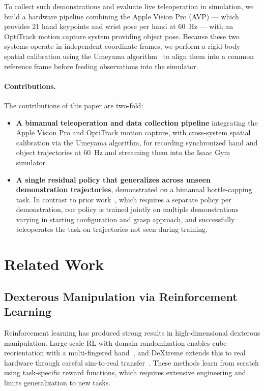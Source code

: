 To collect such demonstrations and evaluate live teleoperation in simulation, we build
a hardware pipeline combining the Apple Vision Pro (AVP) --- which provides 21 hand
keypoints and wrist pose per hand at \SI{60}{\hertz} --- with an OptiTrack motion
capture system providing object pose.
Because these two systems operate in independent coordinate frames, we perform a
rigid-body spatial calibration using the Umeyama algorithm~\cite{umeyama} to align
them into a common reference frame before feeding observations into the simulator.
 
\paragraph{Contributions.}
The contributions of this paper are two-fold:
\begin{itemize}
    \item \textbf{A bimanual teleoperation and data collection pipeline} integrating the
    Apple Vision Pro and OptiTrack motion capture, with cross-system spatial
    calibration via the Umeyama algorithm, for recording synchronized hand and
    object trajectories at \SI{60}{\hertz} and streaming them into the Isaac Gym
    simulator.
 
    \item \textbf{A single residual policy that generalizes across unseen demonstration
    trajectories}, demonstrated on a bimanual bottle-capping task.
    In contrast to prior work~\cite{maniptrans}, which requires a separate policy per
    demonstration, our policy is trained jointly on multiple demonstrations varying in
    starting configuration and grasp approach, and successfully teleoperates the task
    on trajectories not seen during training.
\end{itemize}
 
\section{Related Work}
\label{sec:related}
 
\subsection{Dexterous Manipulation via Reinforcement Learning}
 
Reinforcement learning has produced strong results in high-dimensional dexterous
manipulation.
Large-scale RL with domain randomization enables cube reorientation with a multi-fingered
hand~\cite{openai_cube}, and DeXtreme extends this to real hardware through careful
sim-to-real transfer~\cite{dextreme}.
These methods learn from scratch using task-specific reward functions, which requires
extensive engineering and limits generalization to new tasks.
 
